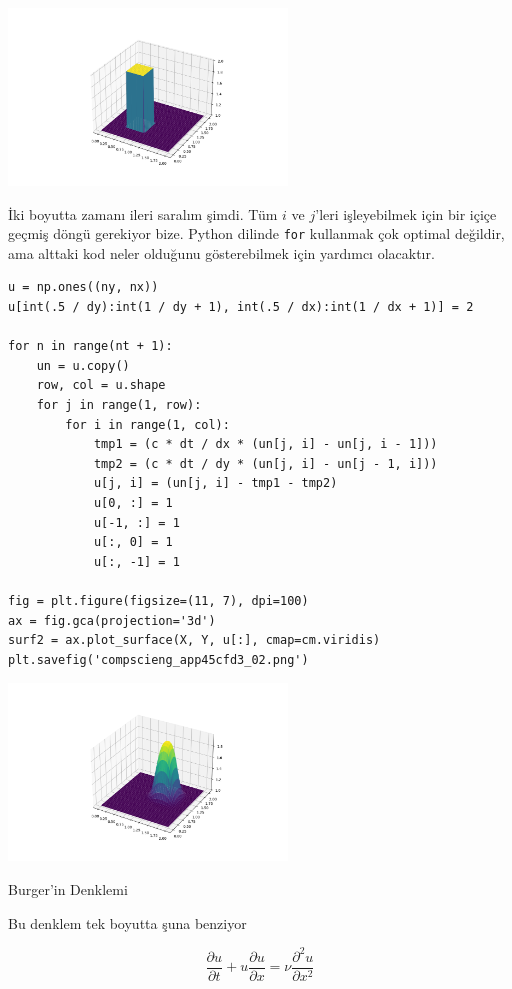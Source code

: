 \documentclass[12pt,fleqn]{article}\usepackage{../../common}
\begin{document}
\includegraphics[width=20em]{compscieng_app45cfd3_01.png}

İki boyutta zamanı ileri saralım şimdi. Tüm $i$ ve $j$'leri işleyebilmek için
bir içiçe geçmiş döngü gerekiyor bize. Python dilinde \verb!for! kullanmak çok
optimal değildir, ama alttaki kod neler olduğunu gösterebilmek için yardımcı
olacaktır.


\begin{verbatim}
u = np.ones((ny, nx))
u[int(.5 / dy):int(1 / dy + 1), int(.5 / dx):int(1 / dx + 1)] = 2

for n in range(nt + 1): 
    un = u.copy()
    row, col = u.shape
    for j in range(1, row):
        for i in range(1, col):
            tmp1 = (c * dt / dx * (un[j, i] - un[j, i - 1]))
            tmp2 = (c * dt / dy * (un[j, i] - un[j - 1, i]))
            u[j, i] = (un[j, i] - tmp1 - tmp2)
            u[0, :] = 1
            u[-1, :] = 1
            u[:, 0] = 1
            u[:, -1] = 1

fig = plt.figure(figsize=(11, 7), dpi=100)
ax = fig.gca(projection='3d')
surf2 = ax.plot_surface(X, Y, u[:], cmap=cm.viridis)
plt.savefig('compscieng_app45cfd3_02.png')
\end{verbatim}

\includegraphics[width=20em]{compscieng_app45cfd3_02.png}

Burger'in Denklemi

Bu denklem tek boyutta şuna benziyor

$$
\frac{\partial u}{\partial t} + u \frac{\partial u}{\partial x} =
\nu \frac{\partial ^2u}{\partial x^2}
$$
\end{document}
